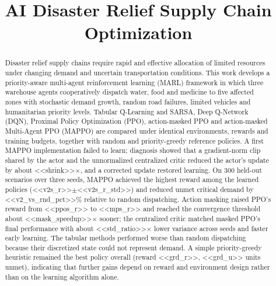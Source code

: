 \documentclass[conference]{IEEEtran}
\begin{document}
\title{AI Disaster Relief Supply Chain Optimization}

\author{
\and
{}
\and
{}
}

\maketitle

\begin{abstract}
Disaster relief supply chains require rapid and effective allocation of limited resources under changing demand and uncertain transportation conditions. This work develops a priority-aware multi-agent reinforcement learning (MARL) framework in which three warehouse agents cooperatively dispatch water, food and medicine to five affected zones with stochastic demand growth, random road failures, limited vehicles and humanitarian priority levels. Tabular Q-Learning and SARSA, Deep Q-Network (DQN), Proximal Policy Optimization (PPO), action-masked PPO and action-masked Multi-Agent PPO (MAPPO) are compared under identical environments, rewards and training budgets, together with random and priority-greedy reference policies. A first MAPPO implementation failed to learn; diagnosis showed that a gradient-norm clip shared by the actor and the unnormalized centralized critic reduced the actor's update by about <<shrink>>$\times$, and a corrected update restored learning. On 300 held-out scenarios over three seeds, MAPPO achieved the highest reward among the learned policies (<<v2s_r>>$\pm$<<v2s_r_std>>) and reduced unmet critical demand by <<v2_vs_rnd_pct>>\% relative to random dispatching. Action masking raised PPO's reward from <<ppos_r>> to <<mps_r>> and reached the convergence threshold about <<mask_speedup>>$\times$ sooner; the centralized critic matched masked PPO's final performance with about <<std_ratio>>$\times$ lower variance across seeds and faster early learning. The tabular methods performed worse than random dispatching because their discretized state could not represent demand. A simple priority-greedy heuristic remained the best policy overall (reward <<grd_r>>, <<grd_u>> units unmet), indicating that further gains depend on reward and environment design rather than on the learning algorithm alone.
\end{abstract}
\end{document}
